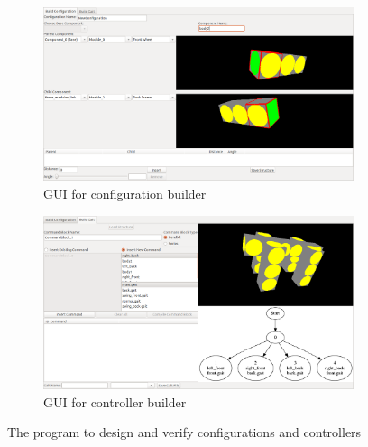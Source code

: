 \documentclass[conference]{IEEEtran}
\theoremstyle{definition}
\newcommand{\TODO}[1]{ {\bf \textcolor{red}{TODO:} #1 }}
\begin{document}
\begin{figure}
\begin{center}
        \begin{subfigure}[b]{0.9\columnwidth}
                \includegraphics[width=\textwidth]{images/conf_window.png}
                \caption{GUI for configuration builder}
                \label{fig:gui_conf}
           \end{subfigure}
           
        \begin{subfigure}[b]{0.9\columnwidth}
                \includegraphics[width=\textwidth]{images/gait_window.png}
                \caption{GUI for controller builder}
                \label{fig:gui_gait}
        \end{subfigure}
\end{center}
\caption{The program to design and verify configurations and controllers}
\label{fig:smores_conf}
\end{figure}

\end{document}
